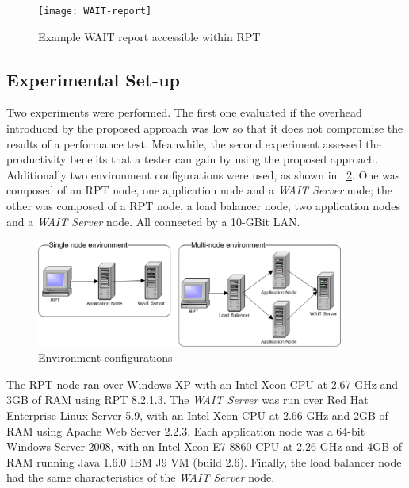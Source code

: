 \documentclass[runningheads,a4paper]{llncs}
\newcommand{\myspaceM}{-7.6pt}
\begin{document}

\begin{figure}[!h]
\centering
\texttt{[image: WAIT-report]}
\caption{Example WAIT report accessible within RPT}
\label{fig_report}
\end{figure}

\vspace{\myspaceM{}}
\subsection{Experimental Set-up}
\vspace{\myspaceM{}}
Two experiments were performed. The first one evaluated if the overhead
introduced by the proposed approach was low so that it does not compromise the
results of a performance test. Meanwhile, the second experiment assessed the
productivity benefits that a tester can gain by using the proposed approach.
Additionally two environment configurations were used, as shown in \figurename
~\ref{fig_env}. One was composed of an RPT node, one application node and a
\emph{WAIT Server} node; the other was composed of a RPT node, a load balancer node, 
two application nodes and a \emph{WAIT Server} node. All connected by a 10-GBit
LAN.

\vspace{-1pt}
\begin{figure}[!h]
\centering
\includegraphics[totalheight=.14\textheight,width=0.9\textwidth]{Environments}
\caption{Environment configurations}
\label{fig_env}
\end{figure}

The RPT node ran over Windows XP with an Intel Xeon CPU at
2.67 GHz and 3GB of RAM using RPT 8.2.1.3. The \emph{WAIT Server} was run over
Red Hat Enterprise Linux Server 5.9, with an Intel Xeon CPU at 2.66 GHz and 2GB of
RAM using Apache Web Server 2.2.3. Each application node was a 64-bit Windows
Server 2008, with an Intel Xeon E7-8860 CPU at 2.26 GHz and 4GB of RAM
running Java 1.6.0 IBM J9 VM (build 2.6). Finally, the load balancer node had
the same characteristics of the \emph{WAIT Server} node. 
\end{document}
